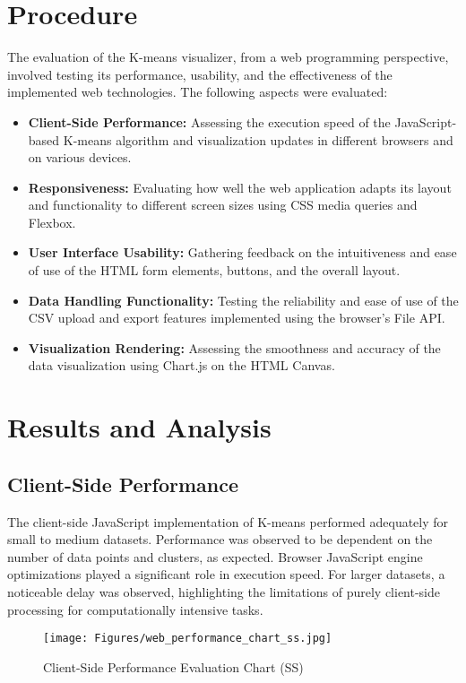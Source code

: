 \documentclass[12pt]{report}
\begin{document}
\section{Procedure}
The evaluation of the K-means visualizer, from a web programming perspective, involved testing its performance, usability, and the effectiveness of the implemented web technologies. The following aspects were evaluated:
\begin{itemize}
    \item \textbf{Client-Side Performance:} Assessing the execution speed of the JavaScript-based K-means algorithm and visualization updates in different browsers and on various devices.
    \item \textbf{Responsiveness:} Evaluating how well the web application adapts its layout and functionality to different screen sizes using CSS media queries and Flexbox.
    \item \textbf{User Interface Usability:} Gathering feedback on the intuitiveness and ease of use of the HTML form elements, buttons, and the overall layout.
    \item \textbf{Data Handling Functionality:} Testing the reliability and ease of use of the CSV upload and export features implemented using the browser's File API.
    \item \textbf{Visualization Rendering:} Assessing the smoothness and accuracy of the data visualization using Chart.js on the HTML Canvas.
\end{itemize}
\section{Results and Analysis}
\subsection{Client-Side Performance}
The client-side JavaScript implementation of K-means performed adequately for small to medium datasets. Performance was observed to be dependent on the number of data points and clusters, as expected. Browser JavaScript engine optimizations played a significant role in execution speed. For larger datasets, a noticeable delay was observed, highlighting the limitations of purely client-side processing for computationally intensive tasks.
\begin{figure}[h]
        \centering
        \texttt{[image: Figures/web\_performance\_chart\_ss.jpg]}
        \caption{Client-Side Performance Evaluation Chart (SS)}
\end{figure}
\end{document}
